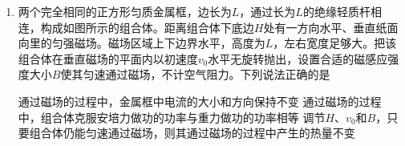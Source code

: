 \documentclass[\gkver]{gaokaozhenti}
\begin{document}
\begin{enumerate}
{	$E_{x} = \frac{W}{2qR}$，$E_{y} = \frac{\sqrt{3}W}{2qR}$，$E = \frac{W}{qR}$，$\tan\theta = \frac{E_{y}}{E_{x}} = \sqrt{3}$

	由于电场方向与水平方向成$60^{\circ}$，则电场与$ab$平行，且沿$a$指向$b$，A 正确；

	B．该粒子从$d$点运动到$b$点，电场力做的功为

	$W' = Eq \frac{R}{2} = 0.5W$

	B 正确；

	C．沿电场线方向电势逐渐降低，则$a$点的电势高于$c$点的电势，C 错误；

	D．若粒子的初速度方向与$ab$平行则粒子做匀变速直线运动，D 错误。

	故选 AB。
}

\item
两个完全相同的正方形匀质金属框，边长为$L$，通过长为$L$的绝缘轻质杆相连，构成如图所示的组合体。距离组合体下底边$H$处有一方向水平、垂直纸面向里的匀强磁场。磁场区域上下边界水平，高度为$L$，左右宽度足够大。把该组合体在垂直磁场的平面内以初速度$v_{0}$水平无旋转抛出，设置合适的磁感应强度大小$B$使其匀速通过磁场，不计空气阻力。下列说法正确的是 


{通过磁场的过程中，金属框中电流的大小和方向保持不变}
{通过磁场的过程中，组合体克服安培力做功的功率与重力做功的功率相等}
{调节$H$、$v_{0}$和$B$，只要组合体仍能匀速通过磁场，则其通过磁场的过程中产生的热量不变}

\end{enumerate}
\end{document}
